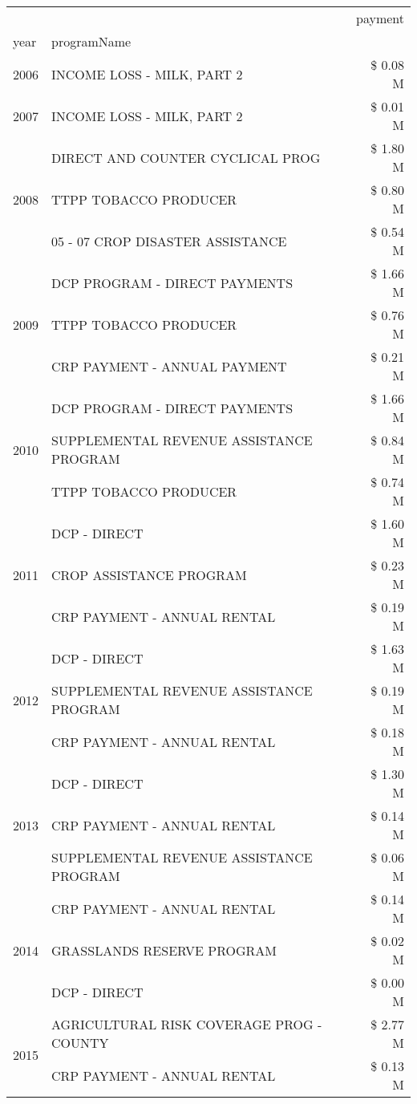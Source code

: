 \begin{tabular}{llr}
\toprule
 &  & payment \\
year & programName &  \\
\midrule
2006 & INCOME LOSS - MILK, PART 2 & \$ 0.08 M \\
\cline{1-3}
2007 & INCOME LOSS - MILK, PART 2 & \$ 0.01 M \\
\cline{1-3}
\multirow[t]{3}{*}{2008} & DIRECT AND COUNTER CYCLICAL PROG & \$ 1.80 M \\
 & TTPP TOBACCO PRODUCER & \$ 0.80 M \\
 & 05 - 07 CROP DISASTER ASSISTANCE & \$ 0.54 M \\
\cline{1-3}
\multirow[t]{3}{*}{2009} & DCP PROGRAM - DIRECT PAYMENTS & \$ 1.66 M \\
 & TTPP TOBACCO PRODUCER & \$ 0.76 M \\
 & CRP PAYMENT - ANNUAL PAYMENT & \$ 0.21 M \\
\cline{1-3}
\multirow[t]{3}{*}{2010} & DCP PROGRAM - DIRECT PAYMENTS & \$ 1.66 M \\
 & SUPPLEMENTAL REVENUE ASSISTANCE PROGRAM & \$ 0.84 M \\
 & TTPP TOBACCO PRODUCER & \$ 0.74 M \\
\cline{1-3}
\multirow[t]{3}{*}{2011} & DCP - DIRECT & \$ 1.60 M \\
 & CROP ASSISTANCE PROGRAM & \$ 0.23 M \\
 & CRP PAYMENT - ANNUAL RENTAL & \$ 0.19 M \\
\cline{1-3}
\multirow[t]{3}{*}{2012} & DCP - DIRECT & \$ 1.63 M \\
 & SUPPLEMENTAL REVENUE ASSISTANCE PROGRAM & \$ 0.19 M \\
 & CRP PAYMENT - ANNUAL RENTAL & \$ 0.18 M \\
\cline{1-3}
\multirow[t]{3}{*}{2013} & DCP - DIRECT & \$ 1.30 M \\
 & CRP PAYMENT - ANNUAL RENTAL & \$ 0.14 M \\
 & SUPPLEMENTAL REVENUE ASSISTANCE PROGRAM & \$ 0.06 M \\
\cline{1-3}
\multirow[t]{3}{*}{2014} & CRP PAYMENT - ANNUAL RENTAL & \$ 0.14 M \\
 & GRASSLANDS RESERVE PROGRAM & \$ 0.02 M \\
 & DCP - DIRECT & \$ 0.00 M \\
\cline{1-3}
\multirow[t]{3}{*}{2015} & AGRICULTURAL RISK COVERAGE PROG - COUNTY & \$ 2.77 M \\
 & CRP PAYMENT - ANNUAL RENTAL & \$ 0.13 M \\

\end{tabular}
